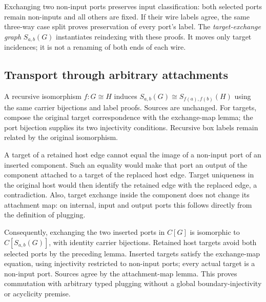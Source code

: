 

Exchanging two non-input ports preserves input classification: both selected
ports remain non-inputs and all others are fixed. If their wire labels agree,
the same three-way case split proves preservation of every port's label.
The \emph{target-exchange graph} $S_{a,b}(G)$ instantiates reindexing with these
proofs. It moves only target incidences; it is not a renaming of both ends
of each wire.




\subsection{Transport through arbitrary attachments}

A recursive isomorphism $f:G\cong H$ induces
$S_{a,b}(G)\cong S_{f(a),f(b)}(H)$ using the same carrier bijections and label
proofs. Sources are unchanged. For targets, compose the original target
correspondence with the exchange-map lemma; the port bijection supplies
its two injectivity conditions. Recursive box labels remain related by the
original isomorphism.


A target of a retained host edge cannot equal the image of a non-input port
of an inserted component. Such an equality would make that port an output
of the component attached to a target of the replaced host edge. Target
uniqueness in the original host would then identify the retained edge with
the replaced edge, a contradiction. Also, target exchange inside the component
does not change its attachment map: on internal, input and output ports this
follows directly from the definition of plugging.



Consequently, exchanging the two inserted ports in $C[G]$ is isomorphic to
$C[S_{a,b}(G)]$, with identity carrier bijections. Retained host targets avoid
both selected ports by the preceding lemma. Inserted targets satisfy the
exchange-map equation, using injectivity restricted to non-input ports;
every actual target is a non-input port. Sources agree by the attachment-map
lemma. This proves commutation with arbitrary typed plugging without a global
boundary-injectivity or acyclicity premise.

